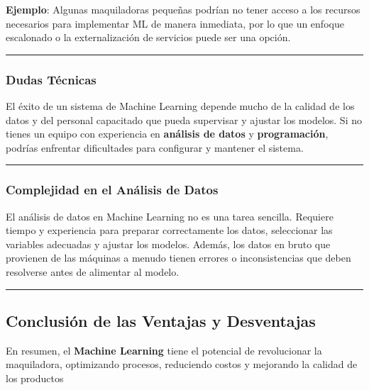 \documentclass[
  10pt,
  letterpaper,
]{book}
\begin{document}
\textbf{Ejemplo}: Algunas maquiladoras pequeñas podrían no tener acceso
a los recursos necesarios para implementar ML de manera inmediata, por
lo que un enfoque escalonado o la externalización de servicios puede ser
una opción.

\begin{center}\rule{0.5\linewidth}{0.5pt}\end{center}

\subsubsection{\texorpdfstring{\textbf{Dudas
Técnicas}}{Dudas Técnicas}}\label{dudas-tuxe9cnicas}

El éxito de un sistema de Machine Learning depende mucho de la calidad
de los datos y del personal capacitado que pueda supervisar y ajustar
los modelos. Si no tienes un equipo con experiencia en \textbf{análisis
de datos} y \textbf{programación}, podrías enfrentar dificultades para
configurar y mantener el sistema.

\begin{center}\rule{0.5\linewidth}{0.5pt}\end{center}

\subsubsection{\texorpdfstring{\textbf{Complejidad en el Análisis de
Datos}}{Complejidad en el Análisis de Datos}}\label{complejidad-en-el-anuxe1lisis-de-datos}

El análisis de datos en Machine Learning no es una tarea sencilla.
Requiere tiempo y experiencia para preparar correctamente los datos,
seleccionar las variables adecuadas y ajustar los modelos. Además, los
datos en bruto que provienen de las máquinas a menudo tienen errores o
inconsistencias que deben resolverse antes de alimentar al modelo.

\begin{center}\rule{0.5\linewidth}{0.5pt}\end{center}

\subsection{Conclusión de las Ventajas y
Desventajas}\label{conclusiuxf3n-de-las-ventajas-y-desventajas}

En resumen, el \textbf{Machine Learning} tiene el potencial de
revolucionar la maquiladora, optimizando procesos, reduciendo costos y
mejorando la calidad de los productos
\end{document}
